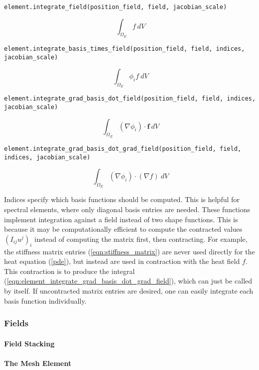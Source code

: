 {\scriptsize
\begin{verbatim}
element.integrate_field(position_field, field, jacobian_scale)
\end{verbatim}
}
\begin{equation}
\int_{\Omega_E} f~dV
\label{eqn:element_integrate_field}
\end{equation}
{\scriptsize
\begin{verbatim}
element.integrate_basis_times_field(position_field, field, indices, jacobian_scale)
\end{verbatim}
}
\begin{equation}
\int_{\Omega_E} \phi_i f~dV
\label{eqn:element_integrate_basis_times_field}
\end{equation}
{\scriptsize
\begin{verbatim}
element.integrate_grad_basis_dot_field(position_field, field, indices, jacobian_scale)
\end{verbatim}
}
\begin{equation}
\int_{\Omega_E} (\nabla \phi_i)\cdot \mathbf{f}~dV
\label{eqn:element_integrate_grad_basis_dot_field}
\end{equation}
{\scriptsize
\begin{verbatim}
element.integrate_grad_basis_dot_grad_field(position_field, field, indices, jacobian_scale)
\end{verbatim}
}
\begin{equation}
\int_{\Omega_E} (\nabla \phi_i)\cdot (\nabla f)~dV
\label{eqn:element_integrate_grad_basis_dot_grad_field}
\end{equation}

Indices specify which basis functions should be computed. This is helpful for spectral elements, where only diagonal basis entries are needed. These functions implement integration against a field instead of two shape functions. This is because it may be computationally efficient to compute the contracted values $(I_{ij}u^j)_i$ instead of computing the matrix first, then contracting. For example, the stiffness matrix entries (\ref{eqn:stiffness_matrix}) are never used directly for the heat equation (\ref{pde}), but instead are used in contraction with the heat field $f$. This contraction is to produce the integral (\ref{eqn:element_integrate_grad_basis_dot_grad_field}), which can just be called by itself. If uncontracted matrix entries are desired, one can easily integrate each basis function individually.

\subsubsection{Fields}

\paragraph{Field Stacking}
\paragraph{The Mesh Element}